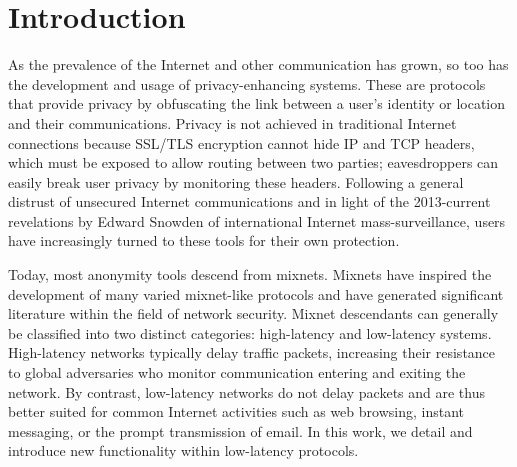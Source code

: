 \documentclass{sig-alternate}
\begin{document}


\printccsdesc


\section{Introduction} %

As the prevalence of the Internet and other communication has grown, so too has the development and usage of privacy-enhancing systems. These are protocols that provide privacy by obfuscating the link between a user's identity or location and their communications. Privacy is not achieved in traditional Internet connections because SSL/TLS encryption cannot hide IP and TCP headers, which must be exposed to allow routing between two parties; eavesdroppers can easily break user privacy by monitoring these headers.\cite{miller2014know} Following a general distrust of unsecured Internet communications and in light of the 2013-current revelations by Edward Snowden of international Internet mass-surveillance, users have increasingly turned to these tools for their own protection.

Today, most anonymity tools descend from mixnets. Mixnets have inspired the development of many varied mixnet-like protocols and have generated significant literature within the field of network security.\cite{edman2009anonymity} Mixnet descendants can generally be classified into two distinct categories: high-latency and low-latency systems. High-latency networks typically delay traffic packets, increasing their resistance to global adversaries who monitor communication entering and exiting the network. By contrast, low-latency networks do not delay packets and are thus better suited for common Internet activities such as web browsing, instant messaging, or the prompt transmission of email.\cite{dingledine2004tor} In this work, we detail and introduce new functionality within low-latency protocols.
\end{document}
